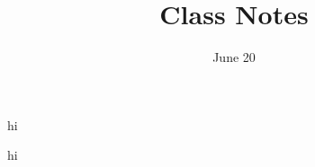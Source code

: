 \documentclass[12pt]{scrartcl}
\title{Class Notes}
\date{June 20}
\begin{document}
\maketitle

\pagebreak

\begin{exercise}
    hi
\end{exercise}

\begin{remark}
    hi
\end{remark}
\end{document}
